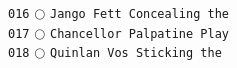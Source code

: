 \documentclass[a4paper,landscape]{article}
\begin{document}
\begin{multicols*}{5}
\texttt{016} \(\bigcirc\)  \texttt{Jango Fett Concealing the} \vspace{-0.3mm}\\ 
\texttt{017} \(\bigcirc\)  \texttt{Chancellor Palpatine Play} \vspace{-0.3mm}\\ 
\texttt{018} \(\bigcirc\)  \texttt{Quinlan Vos Sticking the } \vspace{-0.3mm}\\ 

\end{multicols*}
\end{document}
